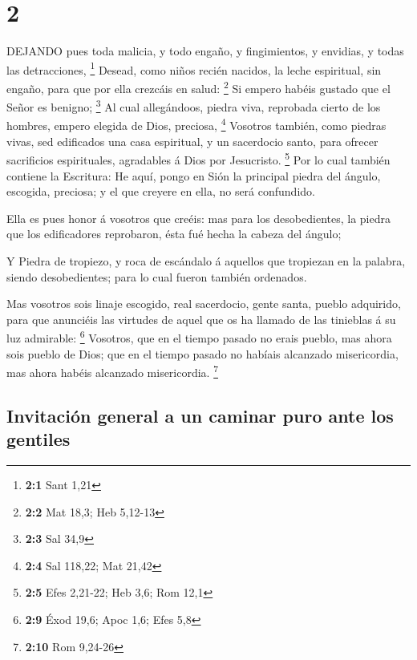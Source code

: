 \hypertarget{section-1}{%
\section{2}\label{section-1}}

 DEJANDO pues toda malicia, y todo engaño, y fingimientos, y
envidias, y todas las detracciones, \footnote{\textbf{2:1} Sant 1,21}
 Desead, como niños recién nacidos, la leche espiritual, sin
engaño, para que por ella crezcáis en salud: \footnote{\textbf{2:2} Mat
  18,3; Heb 5,12-13}  Si empero habéis gustado que el Señor
es benigno; \footnote{\textbf{2:3} Sal 34,9}  Al cual
allegándoos, piedra viva, reprobada cierto de los hombres, empero
elegida de Dios, preciosa, \footnote{\textbf{2:4} Sal 118,22; Mat 21,42}
 Vosotros también, como piedras vivas, sed edificados una
casa espiritual, y un sacerdocio santo, para ofrecer sacrificios
espirituales, agradables á Dios por Jesucristo. \footnote{\textbf{2:5}
  Efes 2,21-22; Heb 3,6; Rom 12,1}  Por lo cual también
contiene la Escritura: He aquí, pongo en Sión la principal piedra del
ángulo, escogida, preciosa; y el que creyere en ella, no será
confundido.

 Ella es pues honor á vosotros que creéis: mas para los
desobedientes, la piedra que los edificadores reprobaron, ésta fué hecha
la cabeza del ángulo;

 Y Piedra de tropiezo, y roca de escándalo á aquellos que
tropiezan en la palabra, siendo desobedientes; para lo cual fueron
también ordenados.

 Mas vosotros sois linaje escogido, real sacerdocio, gente
santa, pueblo adquirido, para que anunciéis las virtudes de aquel que os
ha llamado de las tinieblas á su luz admirable: \footnote{\textbf{2:9}
  Éxod 19,6; Apoc 1,6; Efes 5,8}  Vosotros, que en el
tiempo pasado no erais pueblo, mas ahora sois pueblo de Dios; que en el
tiempo pasado no habíais alcanzado misericordia, mas ahora habéis
alcanzado misericordia. \footnote{\textbf{2:10} Rom 9,24-26}

\hypertarget{invitaciuxf3n-general-a-un-caminar-puro-ante-los-gentiles}{%
\subsection{Invitación general a un caminar puro ante los
gentiles}\label{invitaciuxf3n-general-a-un-caminar-puro-ante-los-gentiles}}

